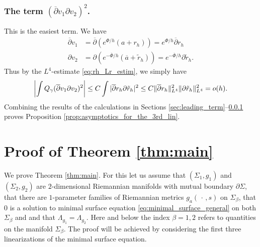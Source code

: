 \documentclass[12pt]{amsart}
\def\p{\partial}
\DeclarePairedDelimiter\norm{\lVert}{\rVert}
\theoremstyle{definition}
\theoremstyle{remark}
\newcommand{\abs}[1]{\lvert #1 \rvert}
\newcommand{\tbl}[1]{\textcolor{blue}{#1}}
\newcommand{\f}[1]{\footnote{\tbl{#1}}}
\newcommand{\op}{\overline \p}
\newcommand{\ccdot}{\,\cdot\,}
\begin{document}
\subsubsection{The term  $(\op v_1 \p v_2)^2$.} \label{sec:smallest_term}
This is the easiest term. We have
\begin{align*}
 \op v_1&=\op (e^{\Phi/h}(a+r_h))=e^{\Phi/h}\op r_h \\
 \p v_2&=\p (e^{-\overline\Phi/h}(\overline a+\tilde r_h))= e^{-\overline\Phi/h}\p \tilde r_h. 
\end{align*}
Thus by the $L^4$-estimate \eqref{eq:rh_Lr_estim},  we simply have
\[
 \left|\int Q_\gamma (\op v_1 \p v_2)^2\right| \leq C \int |\op r_h \p \tilde r_h|^2 \leq C\norm{\op r_h}_{L^4}^2\norm{\p \tilde r_h}_{L^4}^2=o(h).
\] 
% 
Combining the results of the calculations in Sections \ref{sec:leading_term}--\ref{sec:smallest_term} proves Proposition \ref{prop:asymptotics_for_the_3rd_lin}.

\section{Proof of Theorem \ref{thm:main}}\label{sec:proof_of_main_thm} 
We prove Theorem \ref{thm:main}.  For this let us assume that $(\Sigma_1,g_1)$ and $(\Sigma_2,g_2)$ are $2$-dimensional Riemannian manifolds with mutual boundary $\p\Sigma$, that there are $1$-parameter families of Riemannian metrics $g_a(\ccdot,s)$ on $\Sigma_\beta$, that $0$ is a solution to minimal surface equation \eqref{eq:minimal_surface_general} on both $\Sigma_\beta$ and and that $\Lambda_{g_1}=\Lambda_{g_2}$. Here and below the index $\beta=1,2$ refers to quantities on the manifold $\Sigma_\beta$. 
The proof will be achieved by considering the first three linearizations of the minimal surface equation. 
\end{document}
